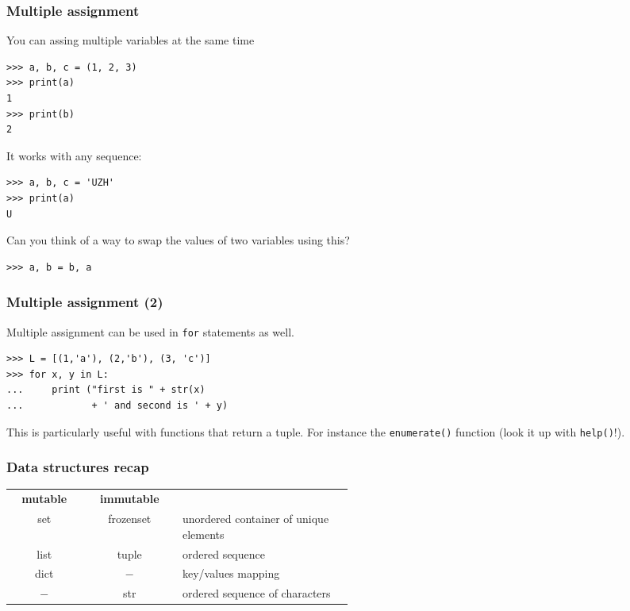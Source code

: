 \documentclass[english,serif,mathserif,xcolor=pdftex,dvipsnames,table]{beamer}
\begin{document}
\begin{frame}[fragile]
\frametitle{Multiple assignment}
You can assing multiple variables at the same time
\begin{lstlisting}
>>> a, b, c = (1, 2, 3)
>>> print(a)
1
>>> print(b)
2
\end{lstlisting}

\+

It works with any sequence:

\begin{lstlisting}
>>> a, b, c = 'UZH'
>>> print(a)
U
\end{lstlisting}

\pause
\begin{question}
  Can you think of a way to swap the values of two variables using this?
\pause
\begin{lstlisting}
>>> a, b = b, a
\end{lstlisting}
\end{question}
\end{frame}

\begin{frame}[fragile]
\frametitle{Multiple assignment (2)}
Multiple assignment can be used in \texttt{for} statements as well.
\begin{lstlisting}
>>> L = [(1,'a'), (2,'b'), (3, 'c')]
>>> for x, y in L:
...     print ("first is " + str(x)
...            + ' and second is ' + y)
\end{lstlisting}

  \+
  This is particularly useful with functions that return a tuple.
  For instance the \texttt{enumerate()} function (look it up with
  \texttt{help()}!).
\end{frame}



\begin{frame}
  \frametitle{Data structures recap}
  \begin{center}
    \begin{tabular}{>{\ttfamily}c|>{\ttfamily}c|>{\footnotesize}p{0.5\linewidth}}
      \rmfamily \textbf{mutable} & \rmfamily \textbf{immutable} & \\
      set & frozenset & unordered container of
      unique elements\\[1ex]
      list & tuple & ordered sequence\\[1ex]
      dict & $-$ & key/values mapping\\[1ex]
      $-$& str & ordered sequence of characters\\
    \end{tabular}
  \end{center}
\end{frame}





\end{document}
